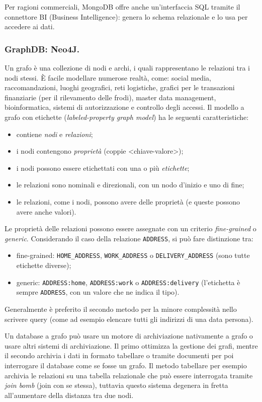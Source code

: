 \documentclass[a4page, 11pt]{article}
\begin{document}
Per ragioni commerciali, MongoDB offre anche un'interfaccia SQL tramite il connettore BI (Business Intelligence): genera lo schema relazionale e lo usa per accedere ai dati.


\subsubsection{GraphDB: Neo4J\cite{GraphDB}.}
Un grafo è una collezione di nodi e archi, i quali rappresentano le relazioni tra i nodi stessi.
È facile modellare numerose realtà, come: social media, raccomandazioni, luoghi geografici, reti logistiche, grafici per le transazioni finanziarie (per il rilevamento delle frodi), master data management, bioinformatica, sistemi di autorizzazione e controllo degli accessi.
Il modello a grafo con etichette (\textit{labeled-property graph model}) ha le seguenti caratteristiche:
\begin{itemize}[noitemsep]
\item contiene \textit{nodi} e \textit{relazioni};
\item i nodi contengono \textit{proprietà} (coppie \textless{}chiave-valore\textgreater{});
\item i nodi possono essere etichettati con una o più \textit{etichette};
\item le relazioni sono nominali e direzionali, con un nodo d'inizio e uno di fine;
\item le relazioni, come i nodi, possono avere delle proprietà (e queste possono avere anche valori).
\end{itemize}
Le proprietà delle relazioni possono essere assegnate con un criterio \textit{fine-grained} o \textit{generic}. Considerando il caso della relazione \texttt{ADDRESS}, si può fare distinzione tra:
\begin{itemize}
\item fine-grained: \texttt{HOME\_ADDRESS}, \texttt{WORK\_ADDRESS} o \texttt{DELIVERY\_ADDRESS} (sono tutte etichette diverse);
\item generic: \texttt{ADDRESS:home}, \texttt{ADDRESS:work} o \texttt{ADDRESS:delivery} (l'etichetta è sempre \texttt{ADDRESS}, con un valore che ne indica il tipo).
\end{itemize}
Generalmente è preferito il secondo metodo per la minore complessità nello scrivere query (come ad esempio elencare tutti gli indirizzi di una data persona).

Un database a grafo può usare un motore di archiviazione nativamente a grafo o usare altri sistemi di archiviazione. Il primo ottimizza la gestione dei grafi, mentre il secondo archivia i dati in formato tabellare o tramite documenti per poi interrogare il database come se fosse un grafo.
Il metodo tabellare per esempio archivia le relazioni su una tabella relazionale che può essere interrogata tramite \textit{join bomb} (join con se stessa), tuttavia questo sistema degenera in fretta all'aumentare della distanza tra due nodi.
\end{document}
